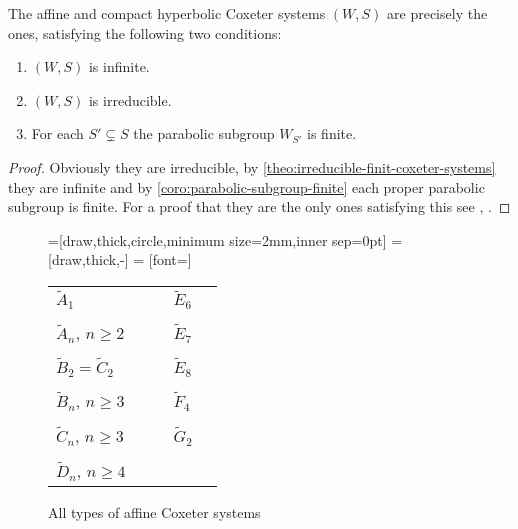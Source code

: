 \begin{lemm}
	The affine and compact hyperbolic Coxeter systems $(W,S)$ are precisely the ones, satisfying the following two conditions:
	\begin{enumerate}
		\item $(W,S)$ is infinite.
		\item $(W,S)$ is irreducible.
		\item For each $S' \subsetneq S$ the parabolic subgroup $W_{S'}$ is finite.
	\end{enumerate}

	\begin{proof}
		Obviously they are irreducible, by \ref{theo:irreducible-finit-coxeter-systems} they are infinite and by \ref{coro:parabolic-subgroup-finite} each proper parabolic subgroup is finite. For a proof that they are the only ones satisfying this see \cite{humphreys:coxeter}, \cite{chein:hyerbolic}.
	\end{proof}
\end{lemm}

\begin{figure}
	\centering
	=[draw,thick,circle,minimum size=2mm,inner sep=0pt]
	 = [draw,thick,-]
	 = [font=\small]

	\begin{tabular}{MMcMM}
	$\tilde A_1$
	&
	\tildeAone
	&
	\hspace*{\cgpadh}
	&
	$\tilde E_6$
	&
	\tildeEsix
	\\
	\vspace*{\cgpadv}
	\\
	$\tilde A_n$, {\tiny $n \geq 2$}
	&
	\tildeAn
	&
	\hspace*{\cgpadh}
	&
	$\tilde E_7$
	&
	\tildeEseven
	\\
	\vspace*{\cgpadv}
	\\
	$\tilde B_2 = \tilde C_2$
	&
	\tildeBCtwo
	&
	\hspace*{\cgpadh}
	&
	$\tilde E_8$
	&
	\tildeEeight
	\\
	\vspace*{\cgpadv}
	\\
	$\tilde B_n$, {\tiny $n \geq 3$}
	&
	\tildeBn
	&
	\hspace*{\cgpadh}
	&
	$\tilde F_4$
	&
	\tildeFfour
	\\
	\vspace*{\cgpadv}
	\\
	$\tilde C_n$, {\tiny $n \geq 3$}
	&
	\tildeCn
	&
	\hspace*{\cgpadh}
	&
	$\tilde G_2$
	&
	\tildeGtwo
	\\
	\vspace*{\cgpadv}
	\\
	$\tilde D_n$, {\tiny $n \geq 4$}
	&
	\tildeDn
	\end{tabular}
	\caption{All types of affine Coxeter systems}
	\label{fig:affine-coxeter-systems}
\end{figure}

